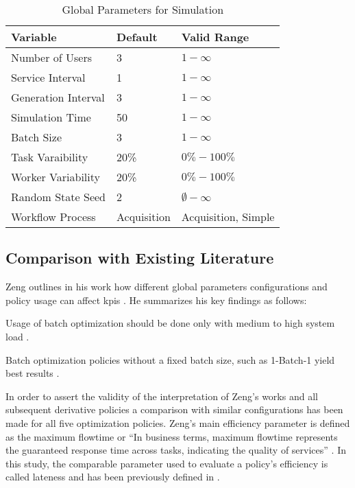 \documentclass{seal_thesis}
\begin{document}
\begin{table}[!ht]
\centering
\begin{tabular}{@{}lll@{}}
\toprule
Variable            & Default     & Valid Range \\ \midrule
Number of Users     & 3           & $1-\infty$      \\
Service Interval    & 1           & $1-\infty$      \\
Generation Interval & 3           & $1-\infty$      \\
Simulation Time     & 50          & $1-\infty$      \\
Batch Size          & 3           & $1-\infty$      \\
Task Varaibility    & 20\%        & $0\%-100\%$      \\
Worker Variability  & 20\%        & $0\%-100\%$      \\
Random State Seed   & 2           & $\emptyset-\infty$      \\
Workflow Process    & Acquisition & Acquisition, Simple      \\ \bottomrule
\end{tabular}
\caption{Global Parameters for Simulation}
\label{tab:global_parameters_sim}
\end{table}

\subsection{Comparison with Existing Literature}

Zeng outlines in his work how different global parameters configurations and policy usage can affect \glspl{kpi} \cite[pp. 18-22]{Zeng2005}. He summarizes his key findings as follows:
\begin{enumerate*}
	\item Usage of batch optimization should be done only with medium to high system load \cite[p. 24]{Zeng2005}.
	\item Batch optimization policies without a fixed batch size, such as 1-Batch-1 yield best results \cite[p. 24]{Zeng2005}.
\end{enumerate*}

In order to assert the validity of the interpretation of Zeng's works and all subsequent derivative policies a comparison with similar configurations has been made for all five optimization policies. Zeng's main efficiency parameter is defined as the maximum flowtime or ``In business terms, maximum flowtime represents the guaranteed response time across tasks, indicating the quality of services'' \cite[p. 17]{Zeng2005}. In this study, the comparable parameter used to evaluate a policy's efficiency is called lateness and has been previously defined in .
\end{document}
